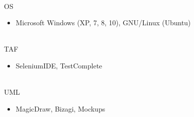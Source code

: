 \documentclass[letterpaper]{twentysecondcv} %
\begin{document}
\begin{twenty}
{		}
		\\
        \twentyitem
	    {OS}
		{}
        {}
        {}
        {}
        {
        {\begin{itemize}
        \item Microsoft Windows (XP, 7, 8, 10), GNU/Linux (Ubuntu)
		\end{itemize}}
		}
		\\
        \twentyitem
	    {TAF}
		{}
        {}
        {}
        {}
        {
        {\begin{itemize}
        \item SeleniumIDE, TestComplete
		\end{itemize}}
		}
		\\
        \twentyitem
	    {UML}
		{}
        {}
        {}
        {}
        {
        {\begin{itemize}
        \item MagicDraw, Bizagi, Mockups
		\end{itemize}}
		}
\end{twenty}
\end{document}
